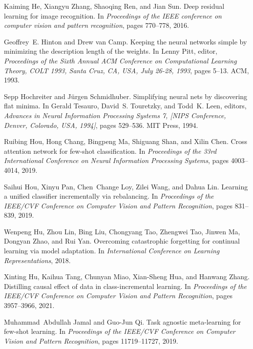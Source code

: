 \documentclass{article}
\begin{document}
\begin{thebibliography}{10}
Kaiming He, Xiangyu Zhang, Shaoqing Ren, and Jian Sun.
\newblock Deep residual learning for image recognition.
\newblock In {\em Proceedings of the IEEE conference on computer vision and
  pattern recognition}, pages 770--778, 2016.

Geoffrey~E. Hinton and Drew van Camp.
\newblock Keeping the neural networks simple by minimizing the description
  length of the weights.
\newblock In Lenny Pitt, editor, {\em Proceedings of the Sixth Annual {ACM}
  Conference on Computational Learning Theory, {COLT} 1993, Santa Cruz, CA,
  USA, July 26-28, 1993}, pages 5--13. {ACM}, 1993.

Sepp Hochreiter and J{\"{u}}rgen Schmidhuber.
\newblock Simplifying neural nets by discovering flat minima.
\newblock In Gerald Tesauro, David~S. Touretzky, and Todd~K. Leen, editors,
  {\em Advances in Neural Information Processing Systems 7, {[NIPS} Conference,
  Denver, Colorado, USA, 1994]}, pages 529--536. {MIT} Press, 1994.

Ruibing Hou, Hong Chang, Bingpeng Ma, Shiguang Shan, and Xilin Chen.
\newblock Cross attention network for few-shot classification.
\newblock In {\em Proceedings of the 33rd International Conference on Neural
  Information Processing Systems}, pages 4003--4014, 2019.

Saihui Hou, Xinyu Pan, Chen~Change Loy, Zilei Wang, and Dahua Lin.
\newblock Learning a unified classifier incrementally via rebalancing.
\newblock In {\em Proceedings of the IEEE/CVF Conference on Computer Vision and
  Pattern Recognition}, pages 831--839, 2019.

Wenpeng Hu, Zhou Lin, Bing Liu, Chongyang Tao, Zhengwei Tao, Jinwen Ma, Dongyan
  Zhao, and Rui Yan.
\newblock Overcoming catastrophic forgetting for continual learning via model
  adaptation.
\newblock In {\em International Conference on Learning Representations}, 2018.

Xinting Hu, Kaihua Tang, Chunyan Miao, Xian-Sheng Hua, and Hanwang Zhang.
\newblock Distilling causal effect of data in class-incremental learning.
\newblock In {\em Proceedings of the IEEE/CVF Conference on Computer Vision and
  Pattern Recognition}, pages 3957--3966, 2021.

Muhammad~Abdullah Jamal and Guo-Jun Qi.
\newblock Task agnostic meta-learning for few-shot learning.
\newblock In {\em Proceedings of the IEEE/CVF Conference on Computer Vision and
  Pattern Recognition}, pages 11719--11727, 2019.


\end{thebibliography}
\end{document}
